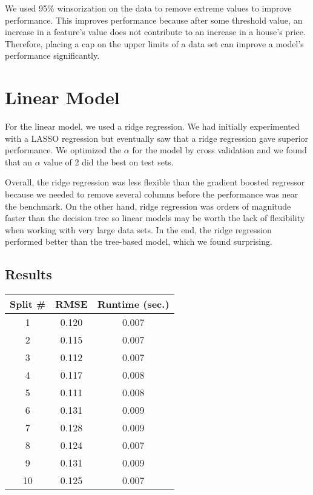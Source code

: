 \documentclass{article}
\begin{document}
We used 95\% winsorization on the data to remove extreme values to improve performance.
This improves performance because after some threshold value, an increase in a feature's 
value does not contribute to an increase in a house's price. Therefore, placing a cap on the upper limits of a data set can improve a model's performance significantly. 

\section{Linear Model}

For the linear model, we used a ridge regression. We had initially experimented with a 
LASSO regression but eventually saw that a ridge regression gave superior performance. 
We optimized the $\alpha$ for the model by cross validation and we found that an $\alpha$ 
value of 2 did the best on test sets. 

Overall, the ridge regression was less flexible than the gradient boosted regressor because we needed to remove several columns before the performance was near the benchmark. On the other hand, ridge regression was orders of magnitude faster than the decision tree so linear models may be worth the lack of flexibility when working with 
very large data sets. In the end, the ridge regression performed better than the tree-based model, which we found surprising. 

\subsection{Results}

\begin{center} 
    \begin{tabular}{ | c |  c |  c |} 
        \hline
        Split \# & RMSE & Runtime (sec.) \\ 
        \hline\hline
        1 & 0.120 & 0.007 \\ 
        \hline 
        2 & 0.115 & 0.007 \\ 
        \hline 
        3 & 0.112 & 0.007 \\ 
        \hline 
        4 & 0.117 & 0.008\\ 
        \hline 
        5 & 0.111 & 0.008 \\ 
        \hline 
        6 & 0.131 & 0.009 \\ 
        \hline
         7 & 0.128 & 0.009 \\ 
         \hline 
        8 & 0.124 & 0.007 \\ 
        \hline 
        9 & 0.131 & 0.009 \\ 
        \hline
        10 & 0.125 & 0.007 \\ 
        \hline 
    \end{tabular} 
\end{center}
\end{document}
